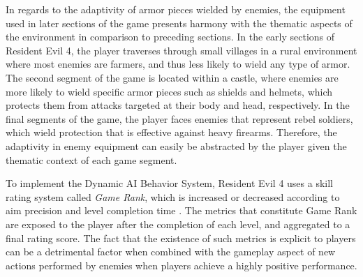 In regards to the adaptivity of armor pieces wielded by enemies, the equipment used in later sections of the game presents harmony with the thematic aspects of the environment in comparison to preceding sections. In the early sections of Resident Evil 4, the player traverses through small villages in a rural environment where most enemies are farmers, and thus less likely to wield any type of armor. The second segment of the game is located within a castle, where enemies are more likely to wield specific armor pieces such as shields and helmets, which protects them from attacks targeted at their body and head, respectively. In the final segments of the game, the player faces enemies that represent rebel soldiers, which wield protection that is effective against heavy firearms. Therefore, the adaptivity in enemy equipment can easily be abstracted by the player given the thematic context of each game segment.


To implement the Dynamic AI Behavior System, Resident Evil 4 uses a skill rating system called \emph{Game Rank}, which is increased or decreased according to aim precision and level completion time \cite{BOOK_RE4JPStrategyGuide}. The metrics that constitute Game Rank are exposed to the player after the completion of each level, and aggregated to a final rating score. The fact that the existence of such metrics is explicit to players can be a detrimental factor when combined with the gameplay aspect of new actions performed by enemies when players achieve a highly positive performance.

